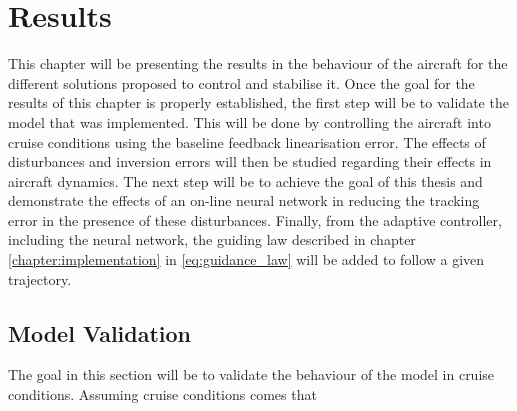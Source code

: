 
\chapter{Results}
\label{chapter:results}

This chapter will be presenting the results in the behaviour of the aircraft for the different solutions proposed to control and stabilise it. Once the goal for the results of this chapter is properly established, the first step will be to validate the model that was implemented. This will be done by controlling the aircraft into cruise conditions using the baseline feedback linearisation error. The effects of disturbances and inversion errors will then be studied regarding their effects in aircraft dynamics. The next step will be to achieve the goal of this thesis and demonstrate the effects of an on-line neural network in reducing the tracking error in the presence of these disturbances. Finally, from the adaptive controller, including the neural network, the guiding law described in chapter \ref{chapter:implementation} in \ref{eq:guidance_law} will be added to follow a given trajectory.


\section{Model Validation}
\label{section:results/validation}

The goal in this section will be to validate the behaviour of the model in cruise conditions. Assuming cruise conditions comes that

